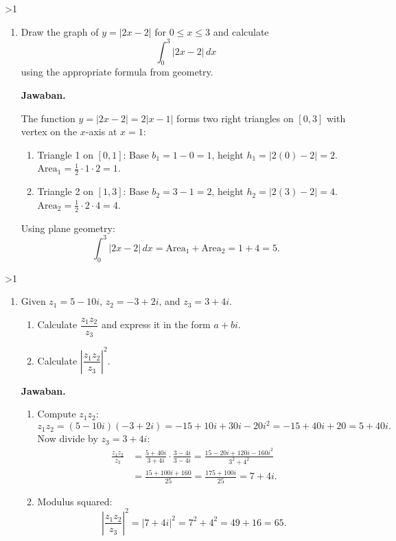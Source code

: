 \documentclass[12pt]{article}
\newcommand{\answername}{Jawaban}
\newenvironment{soaljawab}[1]{%
    \ifnum#1>1\clearpage\fi
    \begin{tcolorbox}[enhanced,breakable,height fill,height fixed for=all,
        sharp corners,colback=white,colframe=black,boxrule=0.4bp,
        boxsep=0pt,left=12bp,right=12bp,top=6bp,bottom=10bp,
        before skip=0pt,after skip=0pt,pad at break=8bp]
    \fontsize{12bp}{14bp}\selectfont
    \setlength{\abovedisplayskip}{8bp}
    \setlength{\belowdisplayskip}{8bp}
    \setlength{\abovedisplayshortskip}{8bp}
    \setlength{\belowdisplayshortskip}{8bp}
    \renewcommand{\arraystretch}{1.15}
    \begin{enumerate}[start=#1,topsep=0pt]
}{%
    \end{enumerate}
    \end{tcolorbox}
}
\newcommand{\jawaban}{\par\medskip\textbf{\answername.}\par\smallskip}
\begin{document}
\begin{soaljawab}{3}
\item Draw the graph of $y = |2x - 2|$ for $0 \le x \le 3$ and calculate
        \[
          \int_{0}^{3} |2x - 2| \, dx
        \]
        using the appropriate formula from geometry.
\jawaban
The function $y = |2x - 2| = 2|x - 1|$ forms two right triangles on $[0, 3]$ with vertex on the $x$-axis at $x = 1$:
        \begin{enumerate}
          \item Triangle 1 on $[0, 1]$:
                Base $b_1 = 1 - 0 = 1$, height $h_1 = |2(0) - 2| = 2$.
                $\text{Area}_1 = \frac{1}{2} \cdot 1 \cdot 2 = 1$.
          \item Triangle 2 on $[1, 3]$:
                Base $b_2 = 3 - 1 = 2$, height $h_2 = |2(3) - 2| = 4$.
                $\text{Area}_2 = \frac{1}{2} \cdot 2 \cdot 4 = 4$.
        \end{enumerate}
        Using plane geometry:
        \[
          \int_{0}^{3} |2x - 2| \, dx = \text{Area}_1 + \text{Area}_2 = 1 + 4 = 5.
        \]
\end{soaljawab}

\begin{soaljawab}{4}
\item Given $z_1 = 5 - 10i$, $z_2 = -3 + 2i$, and $z_3 = 3 + 4i$.
        \begin{enumerate}
          \item Calculate $\dfrac{z_1 z_2}{z_3}$ and express it in the form $a + bi$.
          \item Calculate $\left| \dfrac{z_1 z_2}{z_3} \right|^2$.
        \end{enumerate}
\jawaban
\begin{enumerate}
          \item Compute $z_1 z_2$:
                \[
                  z_1 z_2 = (5 - 10i)(-3 + 2i) = -15 + 10i + 30i - 20i^2 = -15 + 40i + 20 = 5 + 40i.
                \]
                Now divide by $z_3 = 3 + 4i$:
                \begin{align*}
                  \frac{z_1 z_2}{z_3} & = \frac{5 + 40i}{3 + 4i} \cdot \frac{3 - 4i}{3 - 4i} = \frac{15 - 20i + 120i - 160i^2}{3^2 + 4^2} \\
                                      & = \frac{15 + 100i + 160}{25} = \frac{175 + 100i}{25} = 7 + 4i.
                \end{align*}
          \item Modulus squared:
                \[
                  \left| \frac{z_1 z_2}{z_3} \right|^2 = |7 + 4i|^2 = 7^2 + 4^2 = 49 + 16 = 65.
                \]
        \end{enumerate}
\end{soaljawab}
\end{document}
